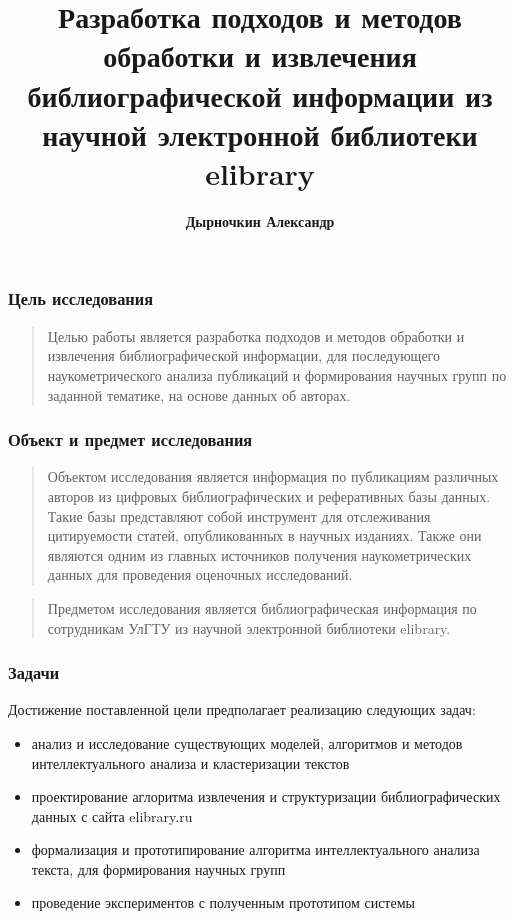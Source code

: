 \documentclass[9pt, compress]{beamer}
\author{\textbf{Дырночкин Александр}}
\title{Разработка подходов и методов обработки и извлечения библиографической информации из научной электронной библиотеки elibrary}
\institute{\textbf{Ульяновский государственный технический университет}}
\date{}
\begin{document}
	\maketitle
	
	\begin{frame}
		\frametitle{Цель исследования}
		\begin{quotation}
			Целью работы является разработка подходов и методов обработки и извлечения библиографической информации,  для последующего наукометрического анализа публикаций и формирования научных групп по заданной тематике, на основе данных об авторах.
		\end{quotation}
	\end{frame}
	
	\begin{frame}
		\frametitle{Объект и предмет исследования}
		\begin{quotation}
			Объектом исследования является информация по публикациям различных авторов из цифровых библиографических и реферативных базы данных. Такие базы представляют собой инструмент для отслеживания цитируемости статей, опубликованных в научных изданиях. Также они являются одним из главных источников получения наукометрических данных для проведения оценочных исследований.
		\end{quotation}
		
		\begin{quotation}
			Предметом исследования является библиографическая информация по сотрудникам УлГТУ из научной электронной библиотеки elibrary.
		\end{quotation}
	\end{frame}

	\begin{frame}
		\frametitle{Задачи}
		Достижение поставленной цели предполагает реализацию следующих задач:
		\begin{itemize}
		    \item анализ и исследование существующих моделей, алгоритмов и методов интеллектуального анализа и кластеризации текстов
			\item проектирование аглоритма извлечения и структуризации библиографических данных с сайта elibrary.ru
			\item формализация и прототипирование алгоритма интеллектуального анализа текста, для формирования научных групп
			\item проведение экспериментов с полученным прототипом системы
		\end{itemize}
	\end{frame}	
	
\end{document}
